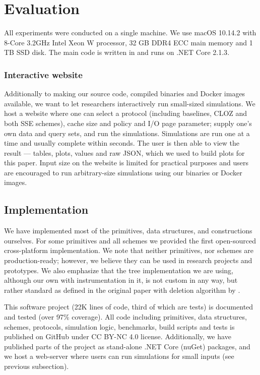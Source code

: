 \section{Evaluation}\label{sec:evaluation}

	All experiments were conducted on a single machine.
	We use macOS 10.14.2 with 8-Core 3.2GHz Intel Xeon W processor, 32 GB DDR4 ECC main memory and 1 TB SSD disk.
	The main code is written in {\Csharp} and runs on {.NET Core 2.1.3}.

	\subsubsection*{Interactive website}\label{sec:website}

		Additionally to making our source code, compiled binaries and Docker images available, we want to let researchers interactively run small-sized simulations.
		We host a website \cite{ore-website} where one can select a protocol (including baselines, CLOZ and both SSE schemes), cache size and policy and I/O page parameter; supply one's own data and query sets, and run the simulations.
		Simulations are run one at a time and usually complete within seconds.
		The user is then able to view the result --- tables, plots, values and raw JSON, which we used to build plots for this paper.
		Input size on the website is limited for practical purposes and users are encouraged to run arbitrary-size simulations using our binaries or Docker images.

	\subsection{Implementation}

		We have implemented most of the primitives, data structures, and constructions ourselves.
		For some primitives and all schemes we provided the first open-sourced cross-platform {\Csharp} implementation.
		We note that neither primitives, nor schemes are production-ready; however, we believe they can be used in research projects and prototypes.
		We also emphasize that the {\BPlus} tree implementation we are using, although our own with instrumentation in it, is not custom in any way, but rather standard as defined in the original paper \cite{b-tree} with deletion algorithm by \cite{b-plus-tree-deletion}.

		This software project (22K lines of code, third of which are tests) is documented and tested (over 97\% coverage).
		All code including primitives, data structures, schemes, protocols, simulation logic, benchmarks, build scripts and tests is published on GitHub \cite{ore-project} under CC BY-NC 4.0 license.
		Additionally, we have published parts of the project as stand-alone {.NET Core} (nuGet) packages, and we host a web-server where users can run simulations for small inputs (see previous subsection).

